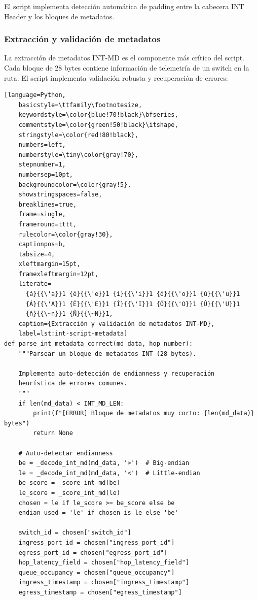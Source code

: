 El script implementa detección automática de padding entre la cabecera INT Header y los bloques de metadatos.

\subsubsection{Extracción y validación de metadatos}
La extracción de metadatos INT-MD es el componente más crítico del script. Cada bloque de 28 bytes contiene información de telemetría de un switch en la ruta. El script implementa validación robusta y recuperación de errores:

\begin{lstlisting}[language=Python,
    basicstyle=\ttfamily\footnotesize,
    keywordstyle=\color{blue!70!black}\bfseries,
    commentstyle=\color{green!50!black}\itshape,
    stringstyle=\color{red!80!black},
    numbers=left,
    numberstyle=\tiny\color{gray!70},
    stepnumber=1,
    numbersep=10pt,
    backgroundcolor=\color{gray!5},
    showstringspaces=false,
    breaklines=true,
    frame=single,
    frameround=tttt,
    rulecolor=\color{gray!30},
    captionpos=b,
    tabsize=4,
    xleftmargin=15pt,
    framexleftmargin=12pt,
    literate=
      {á}{{\'a}}1 {é}{{\'e}}1 {í}{{\'i}}1 {ó}{{\'o}}1 {ú}{{\'u}}1
      {Á}{{\'A}}1 {É}{{\'E}}1 {Í}{{\'I}}1 {Ó}{{\'O}}1 {Ú}{{\'U}}1
      {ñ}{{\~n}}1 {Ñ}{{\~N}}1,
    caption={Extracción y validación de metadatos INT-MD}, 
    label=lst:int-script-metadata]
def parse_int_metadata_correct(md_data, hop_number):
    """Parsear un bloque de metadatos INT (28 bytes).
    
    Implementa auto-detección de endianness y recuperación
    heurística de errores comunes.
    """
    if len(md_data) < INT_MD_LEN:
        print(f"[ERROR] Bloque de metadatos muy corto: {len(md_data)} bytes")
        return None
    
    # Auto-detectar endianness
    be = _decode_int_md(md_data, '>')  # Big-endian
    le = _decode_int_md(md_data, '<')  # Little-endian
    be_score = _score_int_md(be)
    le_score = _score_int_md(le)
    chosen = le if le_score >= be_score else be
    endian_used = 'le' if chosen is le else 'be'
    
    switch_id = chosen["switch_id"]
    ingress_port_id = chosen["ingress_port_id"]
    egress_port_id = chosen["egress_port_id"]
    hop_latency_field = chosen["hop_latency_field"]
    queue_occupancy = chosen["queue_occupancy"]
    ingress_timestamp = chosen["ingress_timestamp"]
    egress_timestamp = chosen["egress_timestamp"]
    

\end{lstlisting}
